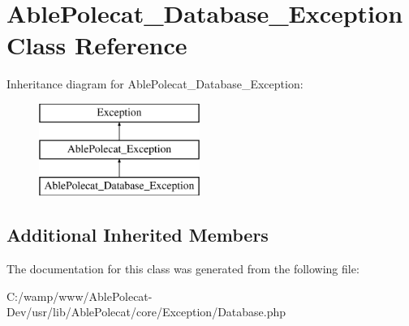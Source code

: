 \hypertarget{class_able_polecat___database___exception}{}\section{Able\+Polecat\+\_\+\+Database\+\_\+\+Exception Class Reference}
\label{class_able_polecat___database___exception}
Inheritance diagram for Able\+Polecat\+\_\+\+Database\+\_\+\+Exception\+:\begin{figure}[H]
\begin{center}
\leavevmode
\includegraphics[height=3.000000cm]{class_able_polecat___database___exception}
\end{center}
\end{figure}
\subsection*{Additional Inherited Members}


The documentation for this class was generated from the following file\+:\begin{DoxyCompactItemize}
\item 
C\+:/wamp/www/\+Able\+Polecat-\/\+Dev/usr/lib/\+Able\+Polecat/core/\+Exception/Database.\+php\end{DoxyCompactItemize}
